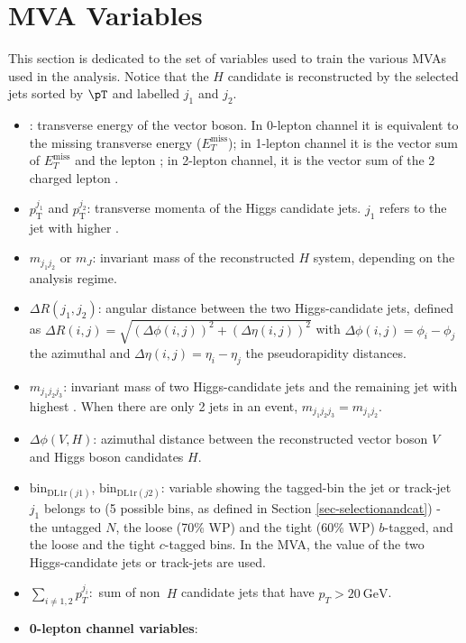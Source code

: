 \section{MVA Variables}\label{ap-MVA}
This section is dedicated to the set of variables used to train the various MVAs used in the analysis. Notice that the $H$ candidate is reconstructed by the selected jets sorted by $\pT$ and labelled $j_1$ and $j_2$.

\begin{itemize}
    \item \ptv: transverse energy of the vector boson. In 0-lepton channel it is equivalent to the missing transverse energy ($E_T^{\textrm{miss}}$); in 1-lepton channel it is the vector sum of $E_T^{\textrm{miss}}$ and the lepton \pt; in 2-lepton channel, it is the vector sum of the 2 charged lepton \pt.
    \item $p_{\text{T}}^{j_1}$ and $p_{\text{T}}^{j_2}$: transverse momenta of the Higgs candidate jets. $j_1$ refers to the jet with higher \pt.
    \item $m_{j_1j_2}$ or $m_J$: invariant mass of the reconstructed $H$ system, depending on the analysis regime.
    \item $\Delta R (j_1,j_2)$: angular distance between the two Higgs-candidate jets, defined as $\Delta R(i,j) = \sqrt{(\Delta\phi(i,j))^2+ (\Delta\eta (i,j))^2}$ with $\Delta\phi(i,j) = \phi_i-\phi_j$ the azimuthal and $\Delta \eta(i,j)= \eta_i-\eta_j$ the pseudorapidity distances.
    \item $m_{j_1 j_2 j_3}$: invariant mass of two Higgs-candidate jets and the remaining jet with highest \pt. When there are only 2 jets in an event, $m_{j_1 j_2 j_3}=m_{j_1j_2}$.
    \item $\Delta \phi(\textbf{$V$},\textbf{$H$})$: azimuthal distance between the reconstructed vector boson $V$ and Higgs boson candidates $H$.
    \item $\mathrm{bin}_{\mathrm{DL1r}(j1)}$, $\mathrm{bin}_{\mathrm{DL1r}(j2)}$: variable showing the tagged-bin the jet or track-jet $j_1$ belongs to (5 possible bins, as defined in Section \ref{sec-selectionandcat}) - the untagged $N$, the loose (70\% WP) and the tight (60\% WP) $b$-tagged, and the loose and the tight $c$-tagged bins. In the MVA, the value of the two Higgs-candidate jets or track-jets are used.
    \item $\sum\limits_{i\neq 1, 2}p_T^{j_i}$:\pt~sum of non~$H$ candidate jets that have $p_T>20~\text{GeV}$.
    \item \textbf{0-lepton channel variables}: 

\end{itemize}
